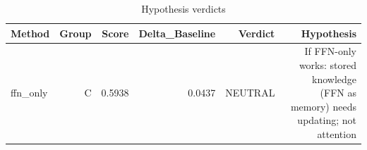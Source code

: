 \begin{table}[htbp]
\centering
\caption{Hypothesis verdicts}
\label{tab:hyp-verdicts}
\begin{tabular}{lrrrrr}
\toprule
\textbf{Method} & \textbf{Group} & \textbf{Score} & \textbf{Delta\_Baseline} & \textbf{Verdict} & \textbf{Hypothesis} \\
\midrule
ffn\_only & C & 0.5938 & 0.0437 & NEUTRAL & If FFN-only works: stored knowledge (FFN as memory) needs updating; not attention \\
\bottomrule
\end{tabular}
\end{table}